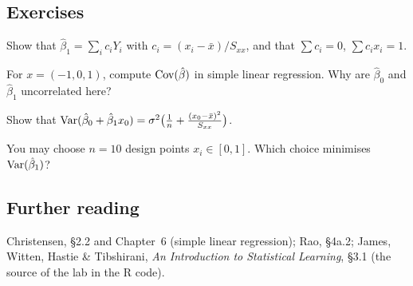 \subsection{Exercises}
\begin{problem}\label{prob:L15-1}
Show that $\hat\beta_1=\sum_ic_iY_i$ with $c_i=(x_i-\bar x)/S_{xx}$, and that $\sum c_i=0$, $\sum c_ix_i=1$.
\end{problem}
\begin{problem}\label{prob:L15-2}
For $x=(-1,0,1)$, compute $\operatorname{Cov}(\hat\beta)$ in simple linear regression. Why are $\hat\beta_0$ and $\hat\beta_1$ uncorrelated here?
\end{problem}
\begin{problem}\label{prob:L15-3}
Show that $\operatorname{Var}(\hat\beta_0+\hat\beta_1x_0)=\sigma^2\bigl(\frac1n+\frac{(x_0-\bar x)^2}{S_{xx}}\bigr)$.
\end{problem}
\begin{problem}\label{prob:L15-4}
You may choose $n=10$ design points $x_i\in[0,1]$. Which choice minimises $\operatorname{Var}(\hat\beta_1)$?
\end{problem}

\subsection{Further reading}
Christensen, \S2.2 and Chapter~6 (simple linear regression); Rao, \S4a.2; James, Witten, Hastie
\& Tibshirani, \emph{An Introduction to Statistical Learning}, \S3.1 (the source of the lab in the R code).
